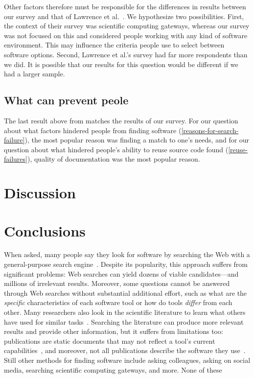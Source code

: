 \documentclass[review]{elsarticle}
\begin{document}
Other factors therefore must be responsible for the differences in results between our survey and that of Lawrence et al.~\citep{lawrence2015science}.  We hypothesize two possibilities.  First, the context of their survey was scientific computing gateways, whereas our survey was not focused on this and considered people working with any kind of software environment.  This may influence the criteria people use to select between software options.  Second, Lawrence et al.'s survey had far more respondents than we did.  It is possible that our results for this question would be different if we had a larger sample.


\subsection{What can prevent peole}


The last result above from \citet{samadi_2004} matches the results of our survey.  For our question about what factors hindered people from finding software (\ref{reasons-for-search-failure}), the most popular reason was finding a match to one's needs, and for our question about what hindered people's ability to reuse source code found (\ref{reuse-failures}), quality of documentation was the most popular reason.




\section{Discussion}
\label{discussion}


\section{Conclusions}
\label{conclusions}


When asked, many people say they look for software by searching the Web with a general-purpose search engine~\citep{samadi_2004, umarji_2008}.  Despite its popularity, this approach suffers from significant problems: Web searches can yield dozens of viable candidates---and millions of irrelevant results.  Moreover, some questions cannot be answered through Web searches without substantial additional effort, such as what are the \emph{specific} characteristics of each software tool or how do tools \emph{differ} from each other.  Many researchers also look in the scientific literature to learn what others have used for similar tasks~\citep{lawrence2015science, joppa2013troubling}.  Searching the literature can produce more relevant results and provide other information, but it suffers from limitations too: publications are static documents that may not reflect a tool's current capabilities~\citep{wren_2004}, and moreover, not all publications describe the software they use~\citep{howison2015software}.  Still other methods for finding software include asking colleagues, asking on social media, searching scientific computing gateways, and more.  None of these 
\end{document}
